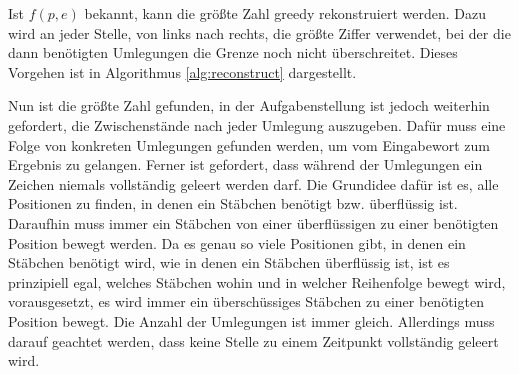 \documentclass[a4paper,10pt,ngerman]{scrartcl}
\begin{document}
Ist $f(p, e)$ bekannt, kann die größte Zahl greedy rekonstruiert werden. Dazu wird an jeder Stelle, von links nach rechts, die größte Ziffer verwendet, bei der die dann benötigten Umlegungen die Grenze noch nicht überschreitet. Dieses Vorgehen ist in Algorithmus \ref{alg:reconstruct} dargestellt.
Nun ist die größte Zahl gefunden, in der Aufgabenstellung ist jedoch weiterhin gefordert, die Zwischenstände nach jeder Umlegung auszugeben.
Dafür muss eine Folge von konkreten Umlegungen gefunden werden, um vom Eingabewort zum Ergebnis zu gelangen. 
Ferner ist gefordert, dass während der Umlegungen ein Zeichen niemals vollständig geleert werden darf. 
Die Grundidee dafür ist es, alle Positionen zu finden, in denen ein Stäbchen benötigt bzw. überflüssig ist. 
Daraufhin muss immer ein Stäbchen von einer überflüssigen zu einer benötigten Position bewegt werden. 
Da es genau so viele Positionen gibt, in denen ein Stäbchen benötigt wird, wie in denen ein Stäbchen überflüssig ist, ist es prinzipiell egal, welches Stäbchen wohin und in welcher Reihenfolge bewegt wird, vorausgesetzt, es wird immer ein überschüssiges Stäbchen zu einer benötigten Position bewegt.
Die Anzahl der Umlegungen ist immer gleich. 
Allerdings muss darauf geachtet werden, dass keine Stelle zu einem Zeitpunkt vollständig geleert wird. 
\end{document}
